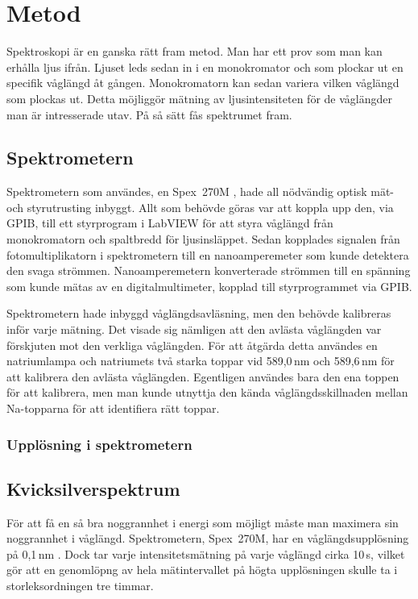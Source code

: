 \documentclass[11pt,a4paper]{article}
\begin{document}
\section{Metod}
Spektroskopi är en ganska rätt fram metod. Man har ett prov som man
kan erhålla ljus ifrån. Ljuset leds sedan in i en monokromator och som
plockar ut en specifik våglängd åt gången. Monokromatorn kan sedan
variera vilken våglängd som plockas ut. Detta möjliggör mätning av
ljusintensiteten för de våglängder man är intresserade utav. På så
sätt fås spektrumet fram.

\subsection{Spektrometern}

Spektrometern som användes, en Spex~270M \cite{Spex270M}, hade all
nödvändig optisk mät- och styrutrusting inbyggt. Allt som behövde
göras var att koppla upp den, via GPIB, till ett styrprogram i LabVIEW
för att styra våglängd från monokromatorn och spaltbredd för
ljusinsläppet. Sedan kopplades signalen från fotomultiplikatorn i
spektrometern till en nanoamperemeter som kunde detektera den svaga
strömmen. Nanoamperemetern konverterade strömmen till en spänning som
kunde mätas av en digitalmultimeter, kopplad till styrprogrammet via
GPIB. 

Spektrometern hade inbyggd våglängdsavläsning, men den behövde
kalibreras inför varje mätning. Det visade sig nämligen att den
avlästa våglängden var förskjuten mot den verkliga våglängden. För att
åtgärda detta användes en natriumlampa och natriumets två starka
toppar vid 589,0\,nm och 589,6\,nm för att kalibrera den avlästa
våglängden. Egentligen användes bara den ena toppen för att kalibrera,
men man kunde utnyttja den kända våglängdsskillnaden mellan
Na-topparna för att identifiera rätt toppar. 

\subsubsection{Upplösning i spektrometern}

\subsection{Kvicksilverspektrum}
För att få en så bra noggrannhet i energi som möjligt måste man
maximera sin noggrannhet i våglängd. Spektrometern, Spex~270M, har en
våglängdsupplösning på 0,1\,nm \cite{Spex270M}. Dock tar varje
intensitetsmätning på varje våglängd cirka 10\,s, vilket gör att en
genomlöpng av hela mätintervallet på högta upplösningen skulle ta i
storleksordningen tre timmar. 
\end{document}
